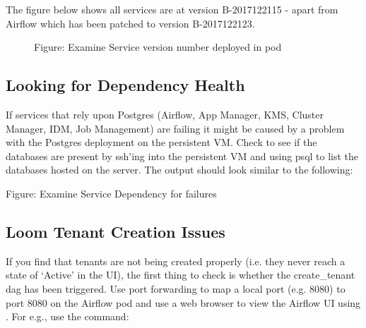 \documentclass[letterpaper,10pt,english]{sphinxmanual}
\begin{document}
\begin{sphinxVerbatim}[commandchars=\\\{\}]
 
\end{sphinxVerbatim}

The figure below shows all services are at version B-2017122115 - apart from Airflow which has been patched to version B-2017122123.

\begin{figure}[htbp]
\centering
\capstart

\noindent{}
\caption{Figure: Examine Service version number deployed in pod}\label{\detokenize{loom_installation_guide:id8}}\end{figure}


\subsection{Looking for Dependency Health}
\label{\detokenize{loom_installation_guide:looking-for-dependency-health}}
If services that rely upon Postgres (Airflow, App Manager, KMS, Cluster Manager, IDM, Job Management) are failing it might be caused by a problem with the Postgres deployment on the persistent VM. Check to see if the databases are present by ssh’ing into the persistent VM and using psql to list the databases hosted on the server. The output should look similar to the following:

\begin{figure}[htbp]
\centering

\noindent{}
\end{figure}

Figure: Examine Service Dependency for failures


\subsection{Loom Tenant Creation Issues}
\label{\detokenize{loom_installation_guide:loom-tenant-creation-issues}}
If you find that tenants are not being created properly (i.e. they never reach a state of ‘Active’ in the UI), the first thing to check is whether the create\_tenant dag has been triggered. Use port forwarding to map a local port (e.g. 8080) to port 8080 on the Airflow pod and use a web browser to view the Airflow UI using . For e.g., use the command:

\begin{sphinxVerbatim}[commandchars=\\\{\}]
     
\end{sphinxVerbatim}
\end{document}
